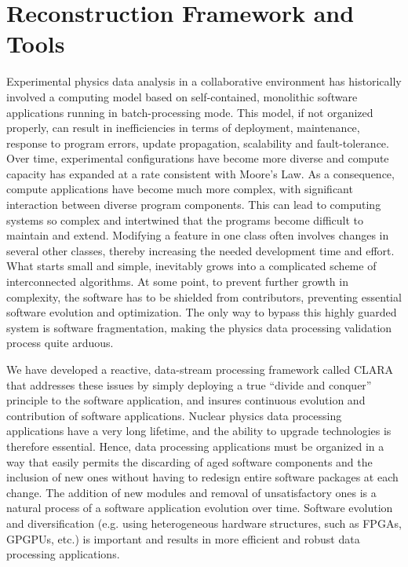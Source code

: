 \section{Reconstruction Framework and Tools}

Experimental physics data analysis in a collaborative environment has historically involved
a computing model based on self-contained, monolithic software applications
running in batch-processing mode.
This model, if not organized properly, can result in inefficiencies in terms
of deployment, maintenance, response to program errors, update propagation,
scalability and fault-tolerance.
Over time, experimental configurations have become more diverse and compute capacity
has expanded at a rate consistent with Moore's Law. As a consequence,
compute applications have become much more complex,
with significant interaction between diverse program components.  This can
lead to computing systems so complex and intertwined that the programs become
difficult to maintain and extend. Modifying a feature
in one class often involves changes in several other classes, thereby increasing the needed development
time and effort. What starts small and simple, inevitably grows into a complicated scheme of interconnected
algorithms. At some point, to prevent further growth in complexity, the software has to be shielded from
contributors, preventing essential software evolution and optimization. The only way to bypass this highly
guarded system is software fragmentation, making the physics data processing validation process quite
arduous.

We have developed a reactive, data-stream processing framework called CLARA
\cite{clara-2011,clara-service,framework,clara-2016} that addresses these issues by simply deploying a true
“divide and conquer” principle to the software application, and insures continuous evolution and contribution of
software applications. Nuclear physics data processing applications have a very long lifetime, and the ability to
upgrade technologies is therefore essential. Hence, data processing applications must be organized in a way
that easily permits the discarding of aged software components and the inclusion of new ones without having to
redesign entire software packages at each change. The addition of new modules and removal of unsatisfactory
ones is a natural process of a software application evolution over time.  Software evolution and diversification
(e.g. using heterogeneous hardware structures, such as FPGAs, GPGPUs, etc.) is important and results in more
efficient and robust data processing applications.

